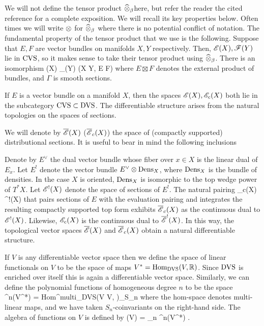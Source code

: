 We will not define the tensor product $\widehat{\otimes}_\beta$here, but refer the reader the cited reference for a complete exposition.
We will recall its key properties below.
Often times we will write $\otimes$ for $\widehat{\otimes}_\beta$ where there is no potential conflict of notation. 
The fundamental property of the tensor product that we use is the following.
Suppose that $E,F$ are vector bundles on manifolds $X,Y$ respectively.
Then, $\mathscr E(X), \mathscr F(Y)$ lie in ${\rm CVS}$, so it makes sense to take their tensor product using $\widehat{\otimes}_\beta$. 
There is an isomorphism
\be\label{tensor1}
\sE(X) \Hat{\tensor}_\beta \sF(Y) \cong \Gamma(X \times Y, E \boxtimes F)
\ee
where $E \boxtimes F$ denotes the external product of bundles, and $\Gamma$ is smooth sections. 

If $E$ is a vector bundle on a manifold $X$, then the spaces $\mathscr E(X), \mathscr E_c(X)$ both lie in the subcategory ${\rm CVS} \subset {\rm DVS}$. 
The differentiable structure arises from the natural topologies on the spaces of sections. 

We will denote by $\overline{\mathscr E}(X)$ ($\overline{\mathscr E}_c(X)$) the space of (compactly supported) distributional sections.
It is useful to bear in mind the following inclusions
\ben
{}
\een

Denote by $E^\vee$ the dual vector bundle whose fiber over $x \in X$ is the linear dual of $E_x$. 
Let $E^!$ denote the vector bundle $E^\vee \otimes {\rm Dens}_X$, where ${\rm Dens}_X$ is the bundle of densities. 
In the case $X$ is oriented, ${\rm Dens}_X$ is isomorphic to the top wedge power of $T^*X$. 
Let $\mathscr E^!(X)$ denote the space of sections of $E^!$. 
The natural pairing 
\ben
\sE_c(X) \tensor \sE^!(X) \to \CC
\een
that pairs sections of $E$ with the evaluation pairing and integrates the resulting compactly supported top form exhibits $\overline{\mathscr E}_c(X)$ as the continuous dual to $\mathscr E^!(X)$. 
Likewise, $\mathscr E_c(X)$ is the continuous dual to $\overline{\mathscr E}^!(X)$. 
In this way, the topological vector spaces $\overline{\mathscr E}(X)$ and $\overline{\mathscr E}_c(X)$ obtain a natural differentiable structure.

If $V$ is any differentiable vector space then we define the space of linear functionals on $V$ to be the space of maps $V^* = {\rm Hom}_{\rm DVS}(V, \mathbb R)$. 
Since ${\rm DVS}$ is enriched over itself this is again a differentiable vector space. 
Similarly, we can define the polynomial functions of homogeneous degree $n$ to be the space
\ben
\Sym^n(V^*) = {\rm Hom}^{multi}_{\rm DVS}(V \times \cdots \times V, \RR)_{S_n}
\een
where the hom-space denotes multi-linear maps, and we have taken $S_n$-coinvariants on the right-hand side.
The algebra of functions on $V$ is defined by
\ben
\sO(V) = \prod_{n} \Sym^n(V^*) .
\een

